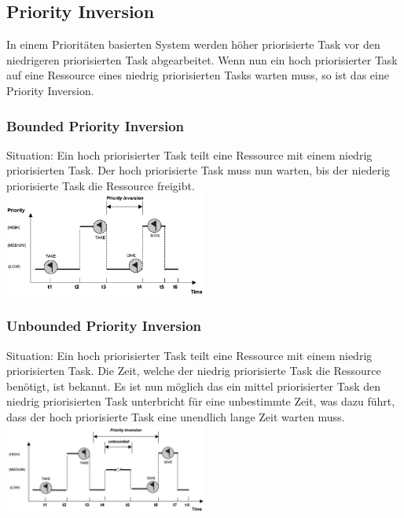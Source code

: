 \subsection{Priority Inversion}
In einem Prioritäten basierten System werden höher priorisierte Task vor den niedrigeren priorisierten Task abgearbeitet. Wenn nun ein hoch priorisierter Task auf eine Ressource eines niedrig priorisierten Tasks warten muss, so ist das eine Priority Inversion.

\subsubsection{Bounded Priority Inversion}
Situation: Ein hoch priorisierter Task teilt eine Ressource mit einem niedrig priorisierten Task. Der hoch priorisierte Task muss nun warten, bis der niederig priorisierte Task die Ressource freigibt. \\
\includegraphics[width=0.5\textwidth]{images/Betriebssysteme/bounded_priority.png}

\subsubsection{Unbounded Priority Inversion}
Situation: Ein hoch priorisierter Task teilt eine Ressource mit einem niedrig priorisierten Task. Die Zeit, welche der niedrig priorisierte Task die Ressource benötigt, ist bekannt. Es ist nun möglich das ein mittel priorisierter Task den niedrig priorisierten Task unterbricht für eine unbestimmte Zeit, was dazu führt, dass der hoch priorisierte Task eine unendlich lange Zeit warten muss. \\
\includegraphics[width=0.5\textwidth]{images/Betriebssysteme/unbounded_priority.png}

